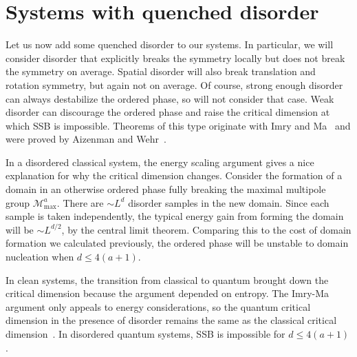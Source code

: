 \documentclass[pra,aps,twocolumn, amsfonts,amsmath,amssymb,nofootinbib,superscriptaddress]{revtex4-2}
\newcommand{\todo}[1]{\textcolor{orange}{#1}}
\renewcommand{\max}{\text{max}}
\newcommand{\ethan}[1]{ { \color{blue} \footnotesize \textsf{ethan: \textsl{#1}} }}
\begin{document}

\section{Systems with quenched disorder} \label{sec:disord}

Let us now add some quenched disorder to our systems. In particular, we will consider disorder that explicitly breaks the symmetry locally but does not break the symmetry on average. Spatial disorder will also break translation and rotation symmetry, but again not on average. Of course, strong enough disorder can always destabilize the ordered phase, so will not consider that case. Weak disorder can discourage the ordered phase and raise the critical dimension at which SSB is impossible. Theorems of this type originate with Imry and Ma~\cite{ImryMa} and were proved by Aizenman and Wehr~\cite{Aizenman}.

In a disordered classical system, the energy scaling argument gives a nice explanation for why the critical dimension changes. Consider the formation of a domain in an otherwise ordered phase fully breaking the maximal multipole group $\mathcal{M}^a_\max$. There are $\sim L^d$ disorder samples in the new domain. Since each sample is taken independently, the typical energy gain from forming the domain will be $\sim L^{d/2}$, by the central limit theorem. Comparing this to the cost of domain formation we calculated previously, the ordered phase will be unstable to domain nucleation when $d\le 4(a+1)$. 

In clean systems, the transition from classical to quantum brought down the critical dimension because the argument depended on entropy. The Imry-Ma argument only appeals to energy considerations, so the quantum critical dimension in the presence of disorder remains the same as the classical critical dimension~\cite{Vojta2013}. In disordered quantum systems, SSB is impossible for $d\le 4(a+1)$.
\end{document}
